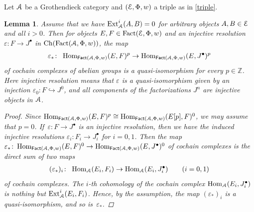 \documentclass[pdftex]{sigma}%
\newtheorem{lem}[dfn]{Lemma}
\numberwithin{equation}{section}
\newcommand{\Ch}{\operatorname{Ch}}
\newcommand{\Fact}{\operatorname{Fact}}
\newcommand{\dgFact}{\operatorname{\sf{Fact}}}
\newcommand{\Hom}{\operatorname{Hom}}
\newcommand{\Ext}{\operatorname{Ext}}
\newcommand{\bZ}{\mathbb{Z}}
\newcommand{\scrA}{\EuScript{A}}
\newcommand{\scrE}{\EuScript{E}}
\newcommand{\hookto}{\hookrightarrow}
\begin{document}
Let $\scrA$ be a Grothendieck category and $(\scrE,\Phi,w)$ a triple as in \eqref{triple}.
\begin{lem}\label{qis}
Assume that we have $\Ext^i_{\scrA}(A,B)=0$ for arbitrary objects $A,B\in \scrE$ and all $i>0$. Then for objects $E,F\in \Fact(\scrE,\Phi,w)$ and an injective resolution $\varepsilon\colon F\to J^{\bullet}$ in $\Ch(\Fact(\scrA,\Phi,w))$, the map
\begin{gather*}
\varepsilon_*\colon\ \Hom_{\dgFact(\scrA,\Phi,w)}(E,F)^p\to\Hom_{\dgFact(\scrA,\Phi,w)}(E,J^{\bullet})^p
\end{gather*}
of cochain complexes of abelian groups is a quasi-isomorphism for every $p\in \bZ$. Here injective resolution means that $\varepsilon$ is a quasi-isomorphism given by an injection $\varepsilon_0\colon F\hookto J^0$, and all components of the factorizations $J^n$ are injective objects in $\scrA$.

\begin{proof}
Since $\Hom_{\dgFact(\scrA,\Phi,w)}(E,F)^p\cong \Hom_{\dgFact(\scrA,\Phi,w)}(E[p],F)^0$, we may assume that $p=0$. If~$\varepsilon\colon F\to J^{\bullet}$ is an injective resolution, then we have the induced injective resolutions $\varepsilon_i\colon F_i\to J^{\bullet}_i$ for $i=0,1$.
Then the map $\varepsilon_*\colon \Hom_{\dgFact(\scrA,\Phi,w)}(E,F)^0\to\Hom_{\dgFact(\scrA,\Phi,w)}(E,J^{\bullet})^0$ of cochain complexes is the direct sum of two maps
\begin{gather*}
(\varepsilon_*)_i\colon\ \Hom_{\scrA}(E_i,F_i)\to \Hom_{\scrA}(E_i,J^{\bullet}_i)\qquad (i=0,1)
\end{gather*}
of cochain complexes. The $i$-th cohomology of the cochain complex $\Hom_{\scrA}(E_i,J^{\bullet}_i)$ is nothing but $\Ext^i_{\scrA}(E_i,F_i)$. Hence, by the assumption, the map $(\varepsilon_*)_i$ is a quasi-isomorphism, and so is~$\varepsilon_*$.
\end{proof}
\end{lem}
\end{document}
